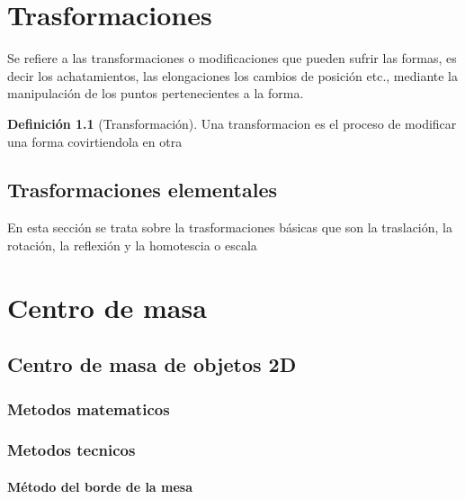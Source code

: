 \documentclass[16pt,]{krantz}
\theoremstyle{definition}
\newtheorem{definition}{Definición}[chapter]
\theoremstyle{definition}
\theoremstyle{definition}
\theoremstyle{definition}
\theoremstyle{remark}
\begin{document}
\hypertarget{trasformaciones}{%
\chapter{Trasformaciones}\label{trasformaciones}}

Se refiere a las transformaciones o modificaciones que pueden sufrir las formas, es decir los achatamientos, las elongaciones los cambios de posición etc., mediante la manipulación de los puntos pertenecientes a la forma.

\begin{definition}[Transformación]
\protect\hypertarget{def:transformacion}{}{\label{def:transformacion} {} }Una transformacion es el proceso de modificar una forma covirtiendola en otra
\end{definition}

\hypertarget{trasformaciones-elementales}{%
\section{Trasformaciones elementales}\label{trasformaciones-elementales}}

En esta sección se trata sobre la trasformaciones básicas que son la traslación, la rotación, la reflexión y la homotescia o escala

\hypertarget{centro-de-masa}{%
\chapter{Centro de masa}\label{centro-de-masa}}

\hypertarget{centro-de-masa-de-objetos-2d}{%
\section{Centro de masa de objetos 2D}\label{centro-de-masa-de-objetos-2d}}

\hypertarget{metodos-matematicos}{%
\subsection{Metodos matematicos}\label{metodos-matematicos}}

\hypertarget{metodos-tecnicos}{%
\subsection{Metodos tecnicos}\label{metodos-tecnicos}}

\hypertarget{muxe9todo-del-borde-de-la-mesa}{%
\subsubsection{Método del borde de la mesa}\label{muxe9todo-del-borde-de-la-mesa}}
\end{document}
